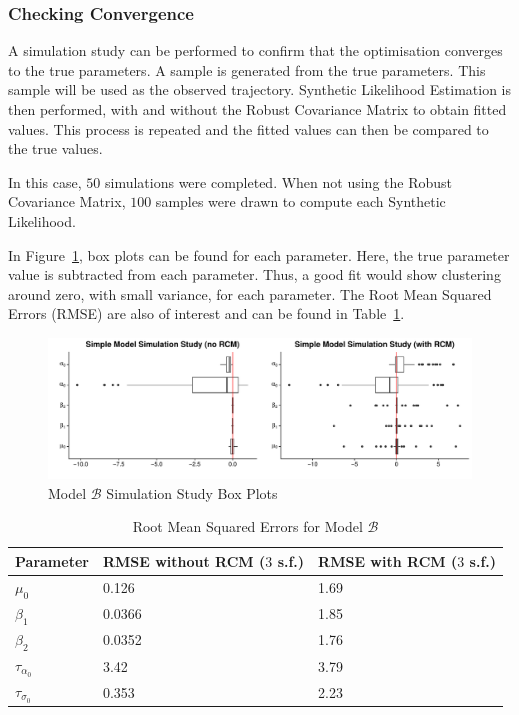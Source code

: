 \subsubsection{Checking Convergence}

A simulation study can be performed to confirm that the optimisation converges to the true parameters. A sample is generated from the true parameters. This sample will be used as the observed trajectory. Synthetic Likelihood Estimation is then performed, with and without the Robust Covariance Matrix to obtain fitted values. This process is repeated and the fitted values can then be compared to the true values.

In this case, $50$ simulations were completed. When not using the Robust Covariance Matrix, $100$ samples were drawn to compute each Synthetic Likelihood.

In Figure~\ref{fig:ss-simple}, box plots can be found for each parameter. Here, the true parameter value is subtracted from each parameter. Thus, a good fit would show clustering around zero, with small variance, for each parameter. The Root Mean Squared Errors (RMSE) are also of interest and can be found in Table~\ref{tab:rmse-simple}.

\begin{figure}[H]
        \centering
        \includegraphics[width=12cm]{images/fitting/simple_model/ss_boxplots.pdf}
        \caption{Model $\mathcal{B}$ Simulation Study Box Plots}
        \label{fig:ss-simple}
\end{figure}

\begin{table}[H]
\caption{Root Mean Squared Errors for Model $\mathcal{B}$}
\label{tab:rmse-simple}
\begin{tabular}{@{}lll@{}}
\toprule
Parameter & RMSE without RCM ($3$ s.f.) & RMSE with RCM ($3$ s.f.) \\ \midrule
$\mu_0$   & 0.126                    & 1.69                  \\
$\beta_1$ & 0.0366                   & 1.85                  \\
$\beta_2$ & 0.0352                   & 1.76                  \\
$\tau_{\alpha_0}$ & 3.42                     & 3.79                  \\
$\tau_{\sigma_0}$ & 0.353                    & 2.23                  \\ \bottomrule
\end{tabular}
\end{table}

